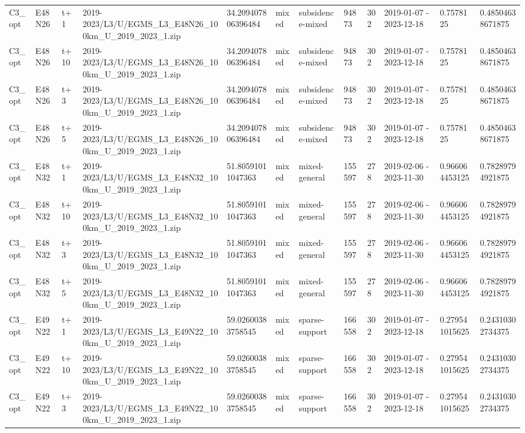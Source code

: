 \begin{landscape}
\begin{longtable}{llllllllllll}
C3\_opt & E48N26 & t+1 & 2019-2023/L3/U/EGMS\_L3\_E48N26\_100km\_U\_2019\_2023\_1.zip & 34.209407806396484 & mixed & subsidence-mixed & 94873 & 302 & 2019-01-07 - 2023-12-18 & 0.7578125 & 0.48504638671875 \\
C3\_opt & E48N26 & t+10 & 2019-2023/L3/U/EGMS\_L3\_E48N26\_100km\_U\_2019\_2023\_1.zip & 34.209407806396484 & mixed & subsidence-mixed & 94873 & 302 & 2019-01-07 - 2023-12-18 & 0.7578125 & 0.48504638671875 \\
C3\_opt & E48N26 & t+3 & 2019-2023/L3/U/EGMS\_L3\_E48N26\_100km\_U\_2019\_2023\_1.zip & 34.209407806396484 & mixed & subsidence-mixed & 94873 & 302 & 2019-01-07 - 2023-12-18 & 0.7578125 & 0.48504638671875 \\
C3\_opt & E48N26 & t+5 & 2019-2023/L3/U/EGMS\_L3\_E48N26\_100km\_U\_2019\_2023\_1.zip & 34.209407806396484 & mixed & subsidence-mixed & 94873 & 302 & 2019-01-07 - 2023-12-18 & 0.7578125 & 0.48504638671875 \\
C3\_opt & E48N32 & t+1 & 2019-2023/L3/U/EGMS\_L3\_E48N32\_100km\_U\_2019\_2023\_1.zip & 51.80591011047363 & mixed & mixed-general & 155597 & 278 & 2019-02-06 - 2023-11-30 & 0.966064453125 & 0.78289794921875 \\
C3\_opt & E48N32 & t+10 & 2019-2023/L3/U/EGMS\_L3\_E48N32\_100km\_U\_2019\_2023\_1.zip & 51.80591011047363 & mixed & mixed-general & 155597 & 278 & 2019-02-06 - 2023-11-30 & 0.966064453125 & 0.78289794921875 \\
C3\_opt & E48N32 & t+3 & 2019-2023/L3/U/EGMS\_L3\_E48N32\_100km\_U\_2019\_2023\_1.zip & 51.80591011047363 & mixed & mixed-general & 155597 & 278 & 2019-02-06 - 2023-11-30 & 0.966064453125 & 0.78289794921875 \\
C3\_opt & E48N32 & t+5 & 2019-2023/L3/U/EGMS\_L3\_E48N32\_100km\_U\_2019\_2023\_1.zip & 51.80591011047363 & mixed & mixed-general & 155597 & 278 & 2019-02-06 - 2023-11-30 & 0.966064453125 & 0.78289794921875 \\
C3\_opt & E49N22 & t+1 & 2019-2023/L3/U/EGMS\_L3\_E49N22\_100km\_U\_2019\_2023\_1.zip & 59.02600383758545 & mixed & sparse-support & 166558 & 302 & 2019-01-07 - 2023-12-18 & 0.279541015625 & 0.24310302734375 \\
C3\_opt & E49N22 & t+10 & 2019-2023/L3/U/EGMS\_L3\_E49N22\_100km\_U\_2019\_2023\_1.zip & 59.02600383758545 & mixed & sparse-support & 166558 & 302 & 2019-01-07 - 2023-12-18 & 0.279541015625 & 0.24310302734375 \\
C3\_opt & E49N22 & t+3 & 2019-2023/L3/U/EGMS\_L3\_E49N22\_100km\_U\_2019\_2023\_1.zip & 59.02600383758545 & mixed & sparse-support & 166558 & 302 & 2019-01-07 - 2023-12-18 & 0.279541015625 & 0.24310302734375 \\

\end{longtable}
\end{landscape}
